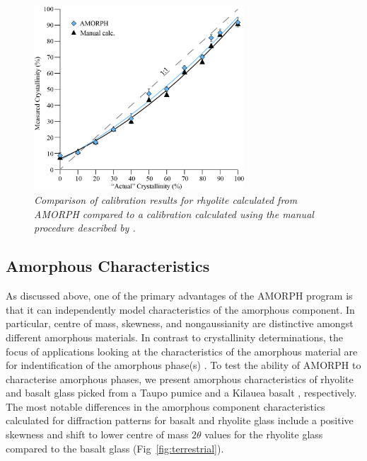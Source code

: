 \documentclass[review]{elsarticle}
\newcommand{\changed}{\color{blue}}
\begin{document}
\begin{figure}[!ht]
\centering
\includegraphics[width=0.7\textwidth]{figures/Comparison.jpg}
\caption{\it \changed Comparison of calibration results for rhyolite calculated from AMORPH compared to a calibration calculated using the manual procedure described by \citet{rowe2012}.\label{fig:Comparison}}
\end{figure}



\subsection{Amorphous Characteristics}
As discussed above, one of the primary advantages of the AMORPH program is that it can
independently model characteristics of the amorphous component.  In particular, centre of mass,
skewness, and nongaussianity are distinctive amongst different amorphous materials. {\changed In contrast to crystallinity determinations, the focus of applications looking at the characteristics of the amorphous material are for indentification of the amorphous phase(s) \citep[e.g.,][]{dehouck2014}. To test
the ability of AMORPH to characterise amorphous phases}, we present amorphous characteristics of rhyolite and basalt glass picked from a
Taupo pumice \citep[73.5 wt\% SiO\textsubscript{2}; P2166C;][]{barker2015} and a Kilauea basalt
\citep[51 wt\% SiO\textsubscript{2}; KS08-108E;][]{wooten2009, rowe2015}, respectively.
{\changed The most notable differences in the amorphous component characteristics calculated for diffraction patterns for basalt and rhyolite glass include a positive skewness and shift to lower centre of mass
$2\theta$ values for the rhyolite glass compared to the basalt glass (Fig~\ref{fig:terrestrial}).} 
\end{document}
